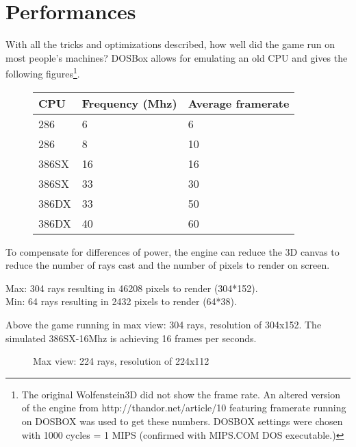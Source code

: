 \section{Performances}
With all the tricks and optimizations described, how well did the game run on most people's machines? DOSBox allows for emulating an old CPU and gives the following figures\footnote{The original Wolfenstein3D did not show the frame rate. An altered version of the engine from http://thandor.net/article/10 featuring framerate running on DOSBOX was used to get these numbers. DOSBOX settings were chosen with 1000 cycles = 1 MIPS (confirmed with MIPS.COM DOS executable.)}.

\begin{figure}[H]
\centering
\begin{tabularx}{\textwidth}{ X X X }
  \toprule
  \textbf{CPU} & \textbf{Frequency (Mhz)} & \textbf{Average framerate} \\ \bottomrule
 286 & 6 & 6 \\
 286 & 8 & 10 \\
 386SX & 16 &  16 \\
 386SX & 33 & 30 \\
 386DX & 33 & 50 \\
 386DX & 40 & 60 \\ \bottomrule
\end{tabularx}
\end{figure}

To compensate for differences of power, the engine can reduce the 3D canvas to reduce the number of rays cast and the number of pixels to render on screen.
\par
Max: 304 rays resulting in 46208 pixels to render (304*152).\\
Min:  64 rays resulting in 2432 pixels to render (64*38).\\

  \begin{figure}[H]
\centering
 \end{figure}
 \par
 Above the game running in max view: 304 rays, resolution of 304x152. The simulated 386SX-16Mhz is achieving 16 frames per seconds.

   \begin{figure}[H]
\centering
 \caption{Max view: 224 rays, resolution of 224x112}
 \end{figure}
 \par


